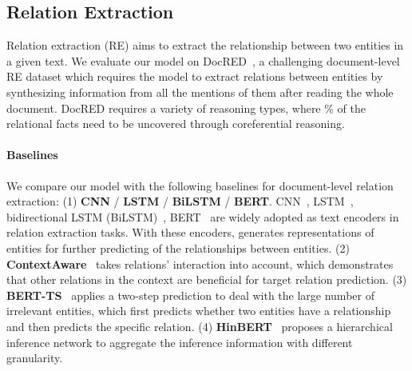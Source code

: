 \documentclass[11pt,a4paper]{article}
\begin{document}
\subsection{Relation Extraction}

Relation extraction (RE) aims to extract the relationship between two entities in a given text. We evaluate our model on DocRED~\citep{DocRED}, a challenging document-level RE dataset which requires the model to extract relations between entities by synthesizing information from all the mentions of them after reading the whole document. DocRED requires a variety of reasoning types, where \% of the relational facts need to be uncovered through coreferential reasoning. 



\vspace{-0.1em}
\paragraph{Baselines} We compare our model with the following baselines for document-level relation extraction: (1) \textbf{CNN} / \textbf{LSTM} / \textbf{BiLSTM} / \textbf{BERT}. CNN~\citep{CNNRE}, LSTM~\citep{LSTM}, bidirectional LSTM (BiLSTM)~\citep{BiLSTM}, BERT~\citep{BERT} are widely adopted as text encoders in relation extraction tasks. With these encoders, \citet{DocRED} generates representations of entities for further predicting of the relationships between entities.
(2) \textbf{ContextAware}~\citep{ContextAware} takes relations' interaction into account, which demonstrates that other relations in the context are beneficial for target relation prediction. (3) \textbf{BERT-TS}~\citep{DocREDBert} applies a two-step prediction to deal with the large number of irrelevant entities, which first predicts whether two entities have a relationship and then predicts the specific relation.
(4) \textbf{HinBERT}~\citep{HinBERT} proposes a hierarchical inference network to  aggregate the inference information with different granularity. 
 
\end{document}
